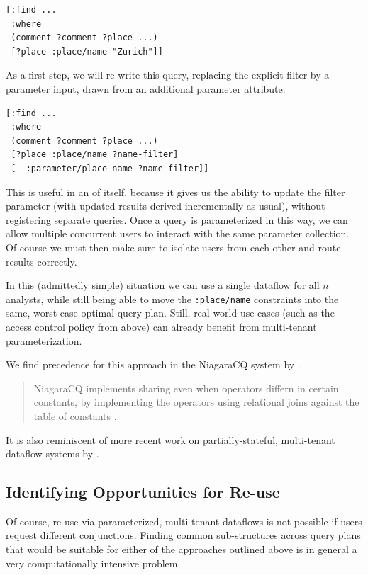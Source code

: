 \documentclass[../catalog.tex]{subfiles}
\begin{document}
\begin{verbatim}
[:find ...
 :where
 (comment ?comment ?place ...)
 [?place :place/name "Zurich"]]
\end{verbatim}

As a first step, we will re-write this query, replacing the explicit
filter by a parameter input, drawn from an additional parameter
attribute.

\begin{verbatim}
[:find ...
 :where
 (comment ?comment ?place ...)
 [?place :place/name ?name-filter]
 [_ :parameter/place-name ?name-filter]]
\end{verbatim}

This is useful in an of itself, because it gives us the ability to
update the filter parameter (with updated results derived
incrementally as usual), without registering separate queries. Once a
query is parameterized in this way, we can allow multiple concurrent
users to interact with the same parameter collection. Of course we
must then make sure to isolate users from each other and route results
correctly.

In this (admittedly simple) situation we can use a single dataflow for
all $n$ analysts, while still being able to move the
\texttt{:place/name} constraints into the same, worst-case optimal
query plan. Still, real-world use cases (such as the access control
policy from above) can already benefit from multi-tenant
parameterization.

We find precedence for this approach in the NiagaraCQ system by
\cite{chen2000niagaracq}.

\begin{quote}
NiagaraCQ implements sharing even when operators differn in certain
constants, by implementing the operators using relational joins
against the table of constants \cite{chen2000niagaracq}.

\cite{hirzel2014catalog}
\end{quote}

It is also reminiscent of more recent work on partially-stateful,
multi-tenant dataflow systems by \cite{gjengset2018noria}.

\subsection{Identifying Opportunities for Re-use}

Of course, re-use via parameterized, multi-tenant dataflows is not
possible if users request different conjunctions. Finding common
sub-structures across query plans that would be suitable for either of
the approaches outlined above is in general a very computationally
intensive problem.
\end{document}
